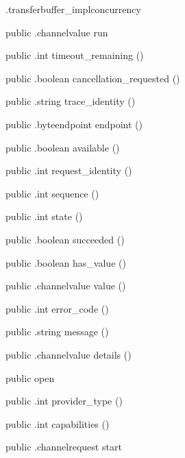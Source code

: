 \begin{CrexxClass}{.transferbuffer\_impl}{concurrency}
\begin{Members}
    \Method
      {public}
      {.channelvalue}
      {run}
      {}

    \Method
      {public}
      {.int}
      {timeout\_remaining}
      {()}

    \Method
      {public}
      {.boolean}
      {cancellation\_requested}
      {()}

    \Method
      {public}
      {.string}
      {trace\_identity}
      {()}

    \Method
      {public}
      {.byteendpoint}
      {endpoint}
      {()}

    \Method
      {public}
      {.boolean}
      {available}
      {()}

    \Method
      {public}
      {.int}
      {request\_identity}
      {()}

    \Method
      {public}
      {.int}
      {sequence}
      {()}

    \Method
      {public}
      {.int}
      {state}
      {()}

    \Method
      {public}
      {.boolean}
      {succeeded}
      {()}

    \Method
      {public}
      {.boolean}
      {has\_value}
      {()}

    \Method
      {public}
      {.channelvalue}
      {value}
      {()}

    \Method
      {public}
      {.int}
      {error\_code}
      {()}

    \Method
      {public}
      {.string}
      {message}
      {()}

    \Method
      {public}
      {.channelvalue}
      {details}
      {()}

    \Factory
      {public}
      {open}
      {}

    \Method
      {public}
      {.int}
      {provider\_type}
      {()}

    \Method
      {public}
      {.int}
      {capabilities}
      {()}

    \Method
      {public}
      {.channelrequest}
      {start}
      {}


\end{Members}
\end{CrexxClass}
